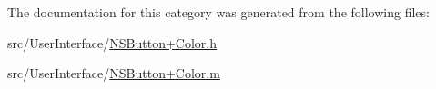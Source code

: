 The documentation for this category was generated from the following files\-:\begin{DoxyCompactItemize}
\item 
src/\-User\-Interface/\hyperlink{_n_s_button_09_color_8h}{N\-S\-Button+\-Color.\-h}\item 
src/\-User\-Interface/\hyperlink{_n_s_button_09_color_8m}{N\-S\-Button+\-Color.\-m}\end{DoxyCompactItemize}
